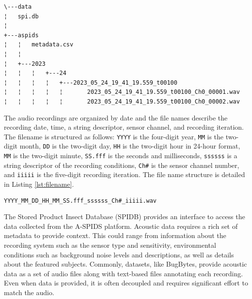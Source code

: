 \documentclass[../Vibro-Acoustic Signatures and Detection Algorithms for Stored Product Insects.tex]{subfiles}
\begin{document}
\begin{listing}[htbp]
	\caption{File organization of the Stored Product Insect Dataset \label{lst:spid_directory}}

	\begin{verbatim}
\---data
¦   spi.db
¦  
+---aspids
¦   ¦   metadata.csv
¦   ¦   
¦   +---2023
¦   ¦   ¦   +---24
¦   ¦   ¦   ¦   +---2023_05_24_19_41_19.559_t00100
¦   ¦   ¦   ¦   ¦       2023_05_24_19_41_19.559_t00100_Ch0_00001.wav
¦   ¦   ¦   ¦   ¦       2023_05_24_19_41_19.559_t00100_Ch0_00002.wav
	\end{verbatim}
\end{listing}

The audio recordings are organized by date and the file names describe the recording date, time, a string descriptor, sensor channel, and recording iteration. The filename is structured as follows: \texttt{YYYY} is the four-digit year, \texttt{MM} is the two-digit month, \texttt{DD} is the two-digit day, \texttt{HH} is the two-digit hour in 24-hour format, \texttt{MM} is the two-digit minute, \texttt{SS.fff} is the seconds and milliseconds, \texttt{ssssss} is a string descriptor of the recording conditions, \texttt{Ch\#} is the sensor channel number, and \texttt{iiiii} is the five-digit recording iteration. The file name structure is detailed in Listing \ref{lst:filename}.

\begin{listing}[htbp]
	\caption{File organization of the Stored Product Insect Dataset \label{lst:filename}}
	\begin{verbatim}
YYYY_MM_DD_HH_MM_SS.fff_ssssss_Ch#_iiiii.wav
	\end{verbatim}
\end{listing}

The Stored Product Insect Database (SPIDB) provides an interface to access the data collected from the A-SPIDS platform. Acoustic data requires a rich set of metadata to provide context. This could range from information about the recording system such as the sensor type and sensitivity, environmental conditions such as background noise levels and descriptions, as well as details about the featured subjects. Commonly, datasets, like BugBytes, provide acoustic data as a set of audio files along with text-based files annotating each recording. Even when data is provided, it is often decoupled and requires significant effort to match the audio.
\end{document}
